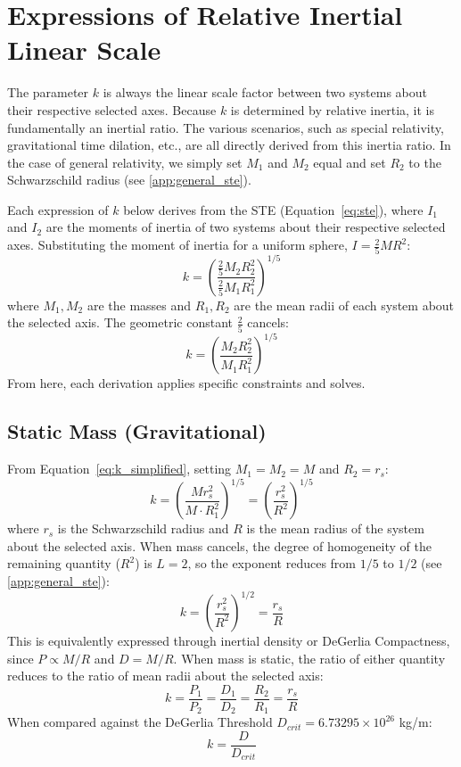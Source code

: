 \section{Expressions of Relative Inertial Linear Scale}

The parameter $k$ is always the linear scale factor between two systems about their respective selected axes. Because $k$ is determined by relative inertia, it is fundamentally an inertial ratio. The various scenarios, such as special relativity, gravitational time dilation, etc., are all directly derived from this inertia ratio. In the case of general relativity, we simply set $M_1$ and $M_2$ equal and set $R_2$ to the Schwarzschild radius (see \ref{app:general_ste}).

Each expression of $k$ below derives from the STE (Equation~\ref{eq:ste}), where $I_1$ and $I_2$ are the moments of inertia of two systems about their respective selected axes. Substituting the moment of inertia for a uniform sphere, $I = \frac{2}{5}MR^2$:
\begin{equation} \label{eq:k_expanded}
k = \left(\frac{\frac{2}{5}M_2 R_2^2}{\frac{2}{5}M_1 R_1^2}\right)^{1/5}
\end{equation}
where $M_1, M_2$ are the masses and $R_1, R_2$ are the mean radii of each system about the selected axis. The geometric constant $\frac{2}{5}$ cancels:
\begin{equation} \label{eq:k_simplified}
k = \left(\frac{M_2 R_2^2}{M_1 R_1^2}\right)^{1/5}
\end{equation}
From here, each derivation applies specific constraints and solves.

\subsection{Static Mass (Gravitational)}
From Equation~\ref{eq:k_simplified}, setting $M_1 = M_2 = M$ and $R_2 = r_s$:
\begin{equation}
k = \left(\frac{M r_s^2}{M \cdot R_1^2}\right)^{1/5} = \left(\frac{r_s^2}{R^2}\right)^{1/5}
\end{equation}
where $r_s$ is the Schwarzschild radius and $R$ is the mean radius of the system about the selected axis. When mass cancels, the degree of homogeneity of the remaining quantity ($R^2$) is $L = 2$, so the exponent reduces from $1/5$ to $1/2$ (see \ref{app:general_ste}):
\begin{equation}
k = \left(\frac{r_s^2}{R^2}\right)^{1/2} = \frac{r_s}{R}
\end{equation}
This is equivalently expressed through inertial density or DeGerlia Compactness, since $P \propto M/R$ and $D = M/R$. When mass is static, the ratio of either quantity reduces to the ratio of mean radii about the selected axis:
\begin{equation}
k = \frac{P_1}{P_2} = \frac{D_1}{D_2} = \frac{R_2}{R_1} = \frac{r_s}{R}
\end{equation}
When compared against the DeGerlia Threshold $D_{crit} = 6.73295 \times 10^{26}$ kg/m:
\begin{equation}
k = \frac{D}{D_{crit}}
\end{equation}

